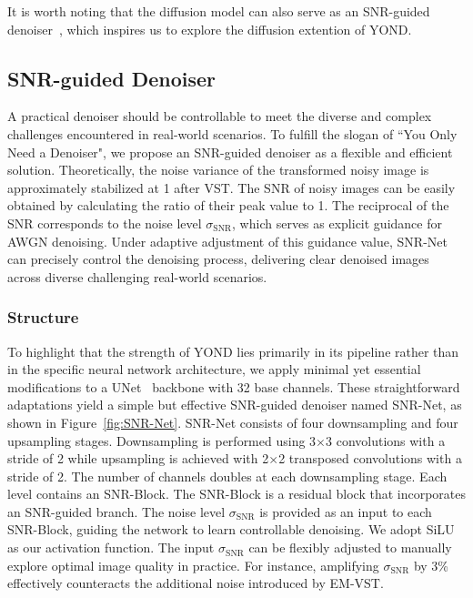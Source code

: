 \documentclass[lettersize,journal]{IEEEtran}
\begin{document}
	It is worth noting that the diffusion model can also serve as an SNR-guided denoiser~\cite{DMID}, which inspires us to explore the diffusion extention of YOND.
	
	\subsection{SNR-guided Denoiser}\label{subsec:snr-net}
	A practical denoiser should be controllable to meet the diverse and complex challenges encountered in real-world scenarios. To fulfill the slogan of ``You Only Need a Denoiser", we propose an SNR-guided denoiser as a flexible and efficient solution.
	Theoretically, the noise variance of the transformed noisy image is approximately stabilized at 1 after VST. The SNR of noisy images can be easily obtained by calculating the ratio of their peak value to 1. The reciprocal of the SNR corresponds to the noise level $\sigma_{\text{SNR}}$, which serves as explicit guidance for AWGN denoising. Under adaptive adjustment of this guidance value, SNR-Net can precisely control the denoising process, delivering clear denoised images across diverse challenging real-world scenarios.
	
	\subsubsection{\textbf{Structure}}
	To highlight that the strength of YOND lies primarily in its pipeline rather than in the specific neural network architecture, we apply minimal yet essential modifications to a UNet~\cite{Unet} backbone with 32 base channels. These straightforward adaptations yield a simple but effective SNR-guided denoiser named SNR-Net, as shown in Figure~\ref{fig:SNR-Net}. SNR-Net consists of four downsampling and four upsampling stages. Downsampling is performed using 3$\times$3 convolutions with a stride of 2 while upsampling is achieved with 2$\times$2 transposed convolutions with a stride of 2. The number of channels doubles at each downsampling stage. Each level contains an SNR-Block. The SNR-Block is a residual block that incorporates an SNR-guided branch. The noise level $\sigma_{\text{SNR}}$ is provided as an input to each SNR-Block, guiding the network to learn controllable denoising. We adopt SiLU~\cite{SiLU} as our activation function. The input $\sigma_{\text{SNR}}$ can be flexibly adjusted to manually explore optimal image quality in practice. For instance, amplifying $\sigma_{\text{SNR}}$ by 3\% effectively counteracts the additional noise introduced by EM-VST.
	
\end{document}
